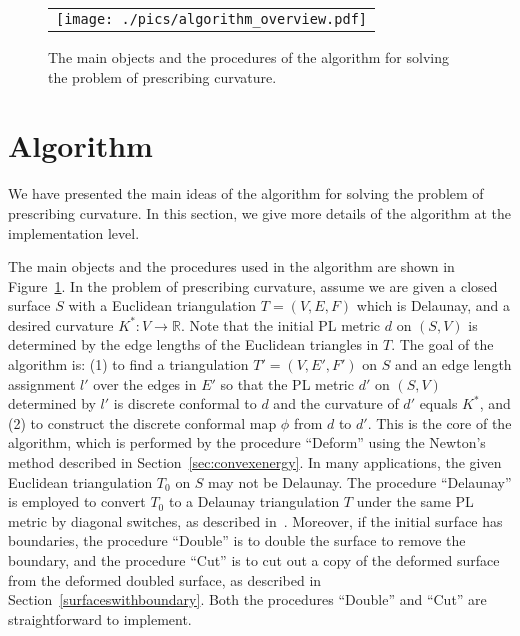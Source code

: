 \documentclass[11pt]{article}
\begin{document}
\begin{figure}[!t]
\begin{center}
\begin{tabular}{c}
\texttt{[image: ./pics/algorithm\_overview.pdf]}
\end{tabular}
\end{center}
\vspace{0.1in}
\caption{The main objects and the procedures of the algorithm for solving 
the problem of prescribing curvature. 
\label{fig:algorithm_overview}}
\end{figure}



\section{Algorithm}
\label{sec:algorithm}
We have presented the main ideas of the algorithm for solving the problem 
of prescribing curvature. In this section, we give more details of the algorithm at 
the implementation level. 


The main objects and the procedures used in the algorithm are shown in Figure~\ref{fig:algorithm_overview}. 
In the problem of prescribing curvature, assume we are given a closed surface $S$ with 
a Euclidean triangulation $T=(V, E, F)$ which is Delaunay, and a desired curvature
$K^*: V \rightarrow \mathbb{R}$. Note that the initial PL metric $d$ on $(S, V)$
is determined by the edge lengths of the Euclidean triangles in $T$. The goal of the algorithm is: 
(1) to find a triangulation $T'=(V, E', F')$ on $S$ and an edge length assignment $l'$ 
over the edges in $E'$ so that the PL metric $d'$ on $(S, V)$ determined by $l'$
is discrete conformal to $d$ and the curvature of $d'$ equals $K^*$, 
and (2) to construct the discrete conformal map $\phi$ from $d$ to $d'$. This is the 
core of the algorithm, which is performed by the procedure ``Deform'' using the Newton's method
described in Section~\ref{sec:convexenergy}. In many applications, 
the given Euclidean triangulation $T_0$ on $S$ may not be Delaunay. The procedure 
``Delaunay'' is employed to convert $T_0$ to a Delaunay triangulation $T$ under the same PL metric
by diagonal switches, as described in~\cite{Fisher:2006}. 
Moreover, if the initial surface has boundaries, the procedure ``Double'' is to double the surface 
to remove the boundary, and the procedure ``Cut'' is to cut out a copy of the deformed surface 
from the deformed doubled surface, as described in Section~\ref{surfaceswithboundary}. 
Both the procedures ``Double'' and ``Cut'' are straightforward to implement. 
\end{document}
